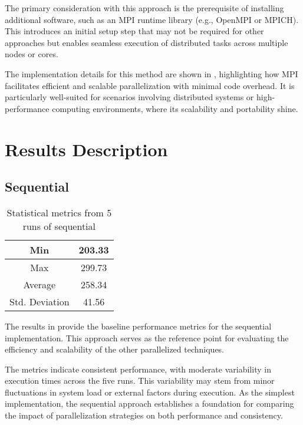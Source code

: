 \documentclass[a4paper, oneside]{article}
\begin{document}
The primary consideration with this approach is the prerequisite of installing additional software, such as an MPI runtime library (e.g., OpenMPI or MPICH). This introduces an initial setup step that may not be required for other approaches but enables seamless execution of distributed tasks across multiple nodes or cores.

The implementation details for this method are shown in , highlighting how MPI facilitates efficient and scalable parallelization with minimal code overhead. It is particularly well-suited for scenarios involving distributed systems or high-performance computing environments, where its scalability and portability shine.

\section{Results Description}
\subsection{Sequential}
\begin{table}[h]
    \centering
    \begin{tabular}{c | c}
        \hline
        Min            & 203.33 \\
        \hline
        Max            & 299.73 \\
        \hline
        Average        & 258.34 \\
        \hline
        Std. Deviation & 41.56  \\
        \hline
    \end{tabular}
    \caption{Statistical metrics from 5 runs of sequential}
    \label{table:stat-sequential}
\end{table}
The results in  provide the baseline performance metrics for the sequential implementation. This approach serves as the reference point for evaluating the efficiency and scalability of the other parallelized techniques.

The metrics indicate consistent performance, with moderate variability in execution times across the five runs. This variability may stem from minor fluctuations in system load or external factors during execution. As the simplest implementation, the sequential approach establishes a foundation for comparing the impact of parallelization strategies on both performance and consistency.
\end{document}
